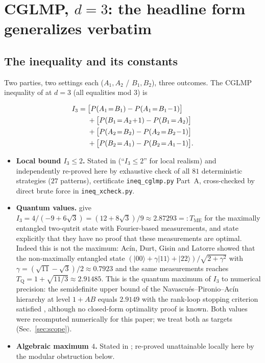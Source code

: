 \documentclass[aps,pra,reprint,superscriptaddress,floatfix]{revtex4-2}
\newcommand{\ket}[1]{\lvert #1\rangle}
\begin{document}
\section{{CGLMP}, $d=3$: the headline form generalizes verbatim}
\label{sec:cglmp}

\subsection{The inequality and its constants}

Two parties, two settings each ($A_{1},A_{2}$ / $B_{1},B_{2}$), three
outcomes. The {CGLMP} inequality of \cite{cglmp2002} at $d=3$ (all
equalities mod $3$) is

\begin{align}
I_{3}={}&
\big[P(A_{1}\!=\!B_{1})-P(A_{1}\!=\!B_{1}\!-\!1)\big]\notag\\
&+\big[P(B_{1}\!=\!A_{2}\!+\!1)-P(B_{1}\!=\!A_{2})\big]\notag\\
&+\big[P(A_{2}\!=\!B_{2})-P(A_{2}\!=\!B_{2}\!-\!1)\big]\notag\\
&+\big[P(B_{2}\!=\!A_{1})-P(B_{2}\!=\!A_{1}\!-\!1)\big].
\label{eq:i3}
\end{align}

\begin{itemize}
\item \textbf{Local bound $I_{3}\le 2$.} Stated in \cite{cglmp2002}
  (``$I_{3}\le 2$'' for local realism) and independently re-proved here by
  exhaustive check of all $81$ deterministic strategies ($27$ patterns),
  certificate \texttt{ineq\_cglmp.py} Part~A, cross-checked by direct
  brute force in \texttt{ineq\_xcheck.py}.
\item \textbf{Quantum values.} \citet{cglmp2002} give
  $I_{3}=4/(-9+6\sqrt{3})=(12+8\sqrt{3})/9\approx 2.87293=:T_{\mathrm{ME}}$
  for the maximally entangled two-qutrit state with Fourier-based
  measurements, and state explicitly that they have no proof that these
  measurements are optimal. Indeed this is not the maximum: Ac\'in, Durt,
  Gisin and Latorre \cite{adgl2002} showed that the non-maximally entangled
  state $(\ket{00}+\gamma\ket{11}+\ket{22})/\sqrt{2+\gamma^{2}}$ with
  $\gamma=(\sqrt{11}-\sqrt{3})/2\approx0.7923$ and the same measurements
  reaches $T_{\mathrm{Q}}=1+\sqrt{11/3}\approx2.91485$. This is the quantum
  maximum of $I_{3}$ to numerical precision: the semidefinite upper bound of
  the Navascu\'es--Pironio--Ac\'in hierarchy at level $1{+}AB$ equals
  $2.9149$ with the rank-loop stopping criterion satisfied \cite{npa2008},
  although no closed-form optimality proof is known. Both values were
  recomputed numerically for this paper; we treat both as targets
  (Sec.~\ref{sec:scope}).
\item \textbf{Algebraic maximum $4$.} Stated in \cite{cglmp2002};
  re-proved unattainable locally here by the modular obstruction below.
\end{itemize}
\end{document}
